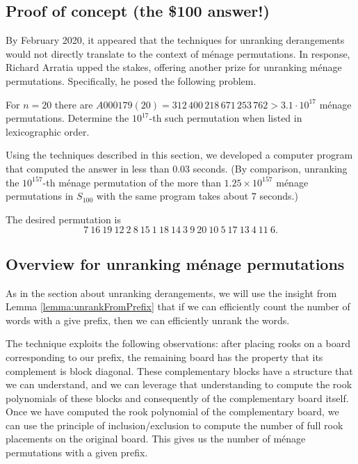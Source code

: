 \subsection{Proof of concept (the \$100 answer!)}
By February 2020, it appeared that the techniques for unranking derangements
would not directly translate to the context of m\'enage permutations. In
response, Richard Arratia upped the stakes, offering another prize for
unranking m\'enage permutations. Specifically, he posed the following problem.
\begin{problem}
  For $n=20$ there are $A000179(20) = 312\,400\,218\,671\,253\,762 > 3.1\cdot 10^{17}$
  m\'enage permutations.
  Determine the $10^{17}$-th such permutation when listed in lexicographic order.
\end{problem}
Using the techniques described in this section, we developed a computer program that
computed the answer in less than $0.03$ seconds.
(By comparison, unranking the $10^{157}$-th m\'enage permutation of the more
than $1.25 \times 10^{157}$ m\'enage permutations in $S_{100}$
with the same program takes about $7$ seconds.)
\begin{answer}
  The desired permutation is \begin{equation}
    7\ 16\ 19\ 12\ 2\ 8\ 15\ 1\ 18\ 14\ 3\ 9\ 20\ 10\ 5\ 17\ 13\ 4\ 11\ 6.
  \end{equation}
\end{answer}

\subsection{Overview for unranking m\'enage permutations}

As in the section about unranking derangements, we will use the insight from
Lemma \ref{lemma:unrankFromPrefix} that if we can efficiently count the number
of words with a give prefix, then we can efficiently unrank the words.

The technique exploits the following observations:
after placing rooks on a board corresponding to our
prefix, the remaining board has the property that its complement is block
diagonal. These complementary blocks have a structure that we can understand,
and we can leverage that understanding to compute the rook polynomials of these
blocks and consequently of the complementary board itself. Once we have computed
the rook polynomial of the complementary board, we can use the principle of
inclusion/exclusion to compute the number of full rook placements on the
original board.
This gives us the number of m\'enage permutations with a given prefix.

